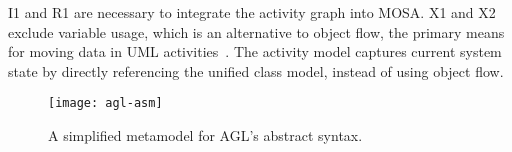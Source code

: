 
\noindent I1 and R1 are necessary to integrate the activity graph into MOSA. X1 and X2 exclude variable usage, which is an alternative to object flow, the primary means for moving data in UML activities~\cite[p.~377]{omg_unified_2017}. The \agl activity model captures current system state by directly referencing the unified class model, instead of using object flow.

%
%
\begin{figure*}[ht]
	\vspace{-0.1cm}	
	\begin{center}
		\texttt{[image: agl-asm]}
	\end{center}
\vspace{-0.6cm}
	\caption{A simplified metamodel for AGL's abstract syntax.} %
	\label{fig:agl-abstractSyntax}
	\vspace{-0.2cm}
\end{figure*}

